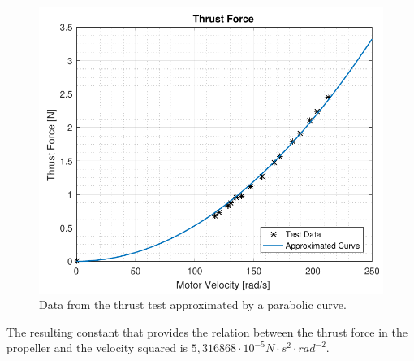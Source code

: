 \begin{figure}[H]
	\centering
	\includegraphics[scale=0.8]{figures/ThrustGraph}
	\caption{Data from the thrust test approximated by a parabolic curve.}
	\label{ThrustGraph}
\end{figure}

The resulting constant that provides the relation between the thrust force in the propeller and the velocity squared is $5,316868\cdot10^{-5} N \cdot s^2 \cdot rad^{-2}$.
